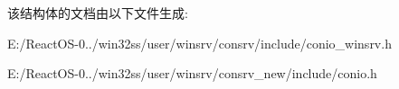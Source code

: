 该结构体的文档由以下文件生成\+:\begin{DoxyCompactItemize}
\item 
E\+:/\+React\+O\+S-\/0../win32ss/user/winsrv/consrv/include/conio\+\_\+winsrv.\+h\item 
E\+:/\+React\+O\+S-\/0../win32ss/user/winsrv/consrv\+\_\+new/include/conio.\+h\end{DoxyCompactItemize}
